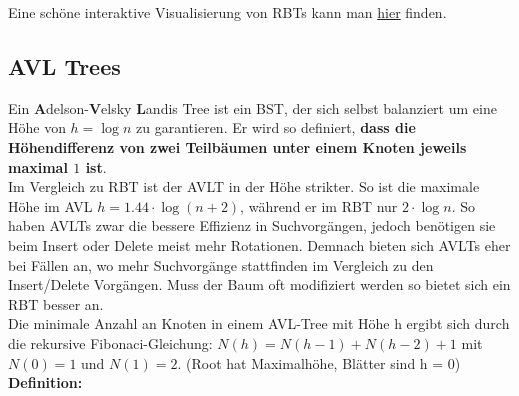 \documentclass[
../AuD-Zusammenfassung.tex,
]
{subfiles}
\begin{document}
Eine schöne interaktive Visualisierung von RBTs kann man \href{https://www.cs.usfca.edu/~galles/visualization/RedBlack.html}{hier} finden.


\subsection{AVL Trees}
Ein \textbf{A}delson-\textbf{V}elsky \textbf{L}andis Tree ist ein BST, der sich selbst balanziert um eine Höhe von $h = \log n$ zu garantieren. Er wird so definiert, \textbf{dass die Höhendifferenz von zwei Teilbäumen unter einem Knoten jeweils maximal $1$ ist}.\\
Im Vergleich zu RBT ist der AVLT in der Höhe strikter. So ist die maximale Höhe im AVL $h = 1.44 \cdot \log (n + 2)$, während er im RBT nur $2 \cdot \log n$. So haben AVLTs zwar die bessere Effizienz in Suchvorgängen, jedoch benötigen sie beim Insert oder Delete meist mehr Rotationen. Demnach bieten sich AVLTs eher bei Fällen an, wo mehr Suchvorgänge stattfinden im Vergleich zu den Insert/Delete Vorgängen. Muss der Baum oft modifiziert werden so bietet sich ein RBT besser an.\\ Die minimale Anzahl an Knoten in einem AVL-Tree mit Höhe h ergibt sich durch die rekursive Fibonaci-Gleichung: $N(h) = N(h - 1) + N(h - 2) + 1$ mit $N(0) = 1$ und $N(1) = 2$. (Root hat Maximalhöhe, Blätter sind h = 0)\\

\textbf{Definition:}

\begin{algorithm}[H]
\end{algorithm}
\end{document}
